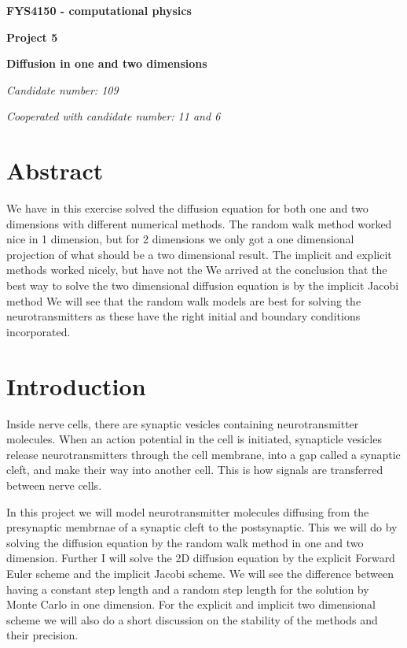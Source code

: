 \documentclass[a4wide,12pt]{article}
\begin{document}
\begin{titlepage}
\begin{center}
\vspace*{5cm}
\Large\textbf{FYS4150 - computational physics}
\vspace{1cm}

\Large\textbf{Project 5}
\vspace*{1cm}

\large\textbf{Diffusion in one and two dimensions}
\vspace{1cm}

\large\textit{Candidate number: 109}


\textit{Cooperated with candidate number: 11 and 6}
\end{center}
\end{titlepage}


\section*{Abstract}
We have in this exercise solved the diffusion equation for both one and two dimensions
with different numerical methods.
The random walk method worked nice in 1 dimension, but for 2 dimensions we only got a one dimensional
projection of what should be a two dimensional result. 
The implicit and explicit methods worked nicely, but have not the 
We arrived at the conclusion that the best way to solve the two dimensional 
diffusion equation is by the implicit Jacobi method
We will see that the random walk models are best for solving the neurotransmitters as these have
the right initial and boundary conditions incorporated. 

\section*{Introduction}
Inside nerve cells, there are synaptic vesicles containing neurotransmitter molecules. 
When an action potential in the cell is initiated, synapticle vesicles release 
neurotransmitters through the cell membrane, into a gap called a synaptic cleft, 
and make their way into another cell. 
This is how signals are transferred between nerve cells.

In this project we will model neurotransmitter molecules diffusing from the presynaptic membrnae of a synaptic cleft
to the postsynaptic. This we will do by solving the diffusion equation by the random walk method in one and two dimension. 
Further I will
solve the 2D diffusion equation by the explicit Forward Euler scheme and the implicit Jacobi scheme. 
We will see the difference between having a constant step length and a random step length for the solution by 
Monte Carlo in one dimension. For the explicit and implicit two dimensional scheme we will also do a short discussion on the stability of the methods and their precision. 
\end{document}
